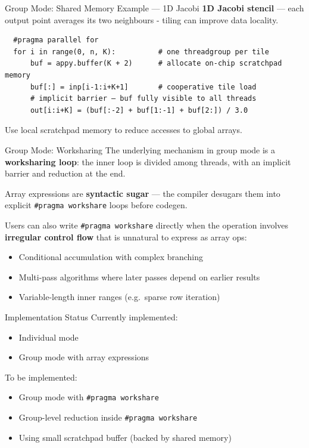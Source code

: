 \documentclass[aspectratio=169]{beamer}
\begin{document}
\begin{frame}[fragile]{Group Mode: Shared Memory Example — 1D Jacobi}
  \textbf{1D Jacobi stencil} — each output point averages its two neighbours - tiling can improve data locality.

  \vspace{0.5em}
  \begin{verbatim}
  #pragma parallel for
  for i in range(0, n, K):          # one threadgroup per tile
      buf = appy.buffer(K + 2)      # allocate on-chip scratchpad memory
      buf[:] = inp[i-1:i+K+1]       # cooperative tile load
      # implicit barrier — buf fully visible to all threads
      out[i:i+K] = (buf[:-2] + buf[1:-1] + buf[2:]) / 3.0
  \end{verbatim}

  \vspace{0.5em}
  Use local scratchpad memory to reduce accesses to global arrays.
\end{frame}

\begin{frame}[fragile]{Group Mode: Worksharing}
  The underlying mechanism in group mode is a \textbf{worksharing loop}:
  the inner loop is divided among threads, with an implicit barrier and reduction at the end.

  \vspace{0.5em}
  Array expressions are \textbf{syntactic sugar} — the compiler desugars them into
  explicit \texttt{\#pragma workshare} loops before codegen.

  \vspace{0.5em}
  Users can also write \texttt{\#pragma workshare} directly when the operation
  involves \textbf{irregular control flow} that is unnatural to express as array ops:

  \begin{itemize}
    \item Conditional accumulation with complex branching
    \item Multi-pass algorithms where later passes depend on earlier results
    \item Variable-length inner ranges (e.g.\ sparse row iteration)
  \end{itemize}
\end{frame}

\begin{frame}[fragile]{Implementation Status}
  Currently implemented:
  \begin{itemize}
    \item Individual mode
    \item Group mode with array expressions
  \end{itemize}
  To be implemented:
  \begin{itemize}
    \item Group mode with \texttt{\#pragma workshare}
    \item Group-level reduction inside \texttt{\#pragma workshare}
    \item Using small scratchpad buffer (backed by shared memory)
  \end{itemize}
\end{frame}  
\end{document}
